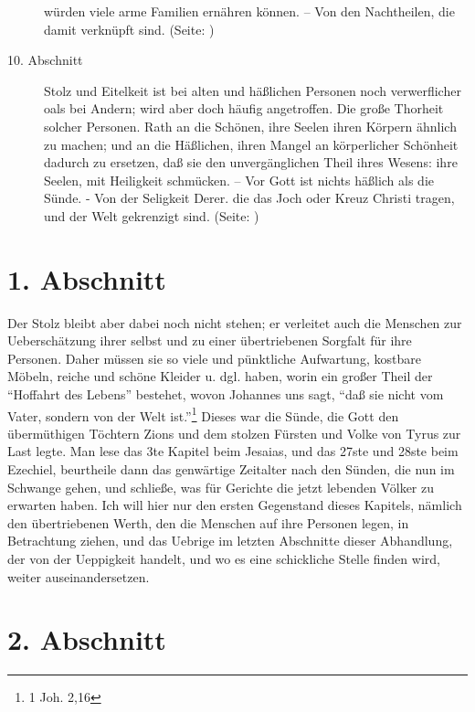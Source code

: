 \begin{description}
würden viele arme Familien ernähren können. -- Von den Nachtheilen, die damit
verknüpft sind. (Seite: \pageref{kap11_ab9})
\item[10. Abschnitt] Stolz und Eitelkeit ist bei alten und häßlichen Personen
noch verwerflicher oals bei Andern; wird aber doch häufig angetroffen. Die große
Thorheit solcher Personen. Rath an die Schönen, ihre Seelen ihren Körpern
ähnlich zu machen; und an die Häßlichen, ihren Mangel an körperlicher Schönheit
dadurch zu ersetzen, daß sie den unvergänglichen Theil ihres Wesens: ihre
Seelen, mit Heiligkeit schmücken. -- Vor Gott ist nichts häßlich als die Sünde.
- Von der Seligkeit Derer. die das Joch oder Kreuz Christi tragen, und der Welt
gekrenzigt sind. (Seite: \pageref{kap11_ab10})

\end{description}
\normalsize

\section{1. Abschnitt} \label{kap11_ab1}

Der Stolz bleibt aber dabei noch nicht stehen; er verleitet auch die Menschen
zur Ueberschätzung ihrer selbst und zu einer übertriebenen Sorgfalt für ihre
Personen. Daher müssen sie so viele und pünktliche Aufwartung, kostbare Möbeln,
reiche und schöne Kleider u. dgl. haben, worin ein großer Theil der "`Hoffahrt
des Lebens"' bestehet, wovon Johannes uns sagt, "`daß sie nicht vom Vater,
sondern von der Welt ist."'\footnote{1 Joh. 2,16} Dieses war die Sünde, die Gott
den übermüthigen Töchtern Zions und dem stolzen Fürsten und Volke von Tyrus zur
Last legte. Man lese das 3te Kapitel beim Jesaias, und das 27ste und 28ste beim
Ezechiel, beurtheile dann das genwärtige Zeitalter nach den Sünden, die nun im
Schwange gehen, und schließe, was für Gerichte die jetzt lebenden Völker zu
erwarten haben. Ich will hier nur den ersten Gegenstand dieses Kapitels, nämlich
den übertriebenen Werth, den die Menschen auf ihre Personen legen, in
Betrachtung ziehen, und das Uebrige im letzten Abschnitte dieser Abhandlung, der
von der Ueppigkeit handelt, und wo es eine schickliche Stelle finden wird,
weiter auseinandersetzen.

\section{2. Abschnitt} \label{kap11_ab2}

